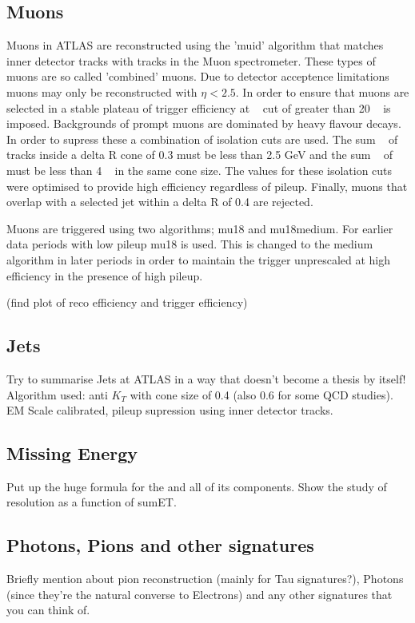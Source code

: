 \subsection{Muons}
\label{sec:muons}
Muons in ATLAS are reconstructed using the 'muid' algorithm that matches inner detector tracks with tracks in the Muon spectrometer. These types of muons are so called 'combined' muons. Due to detector acceptence limitations muons may only be reconstructed with $\eta < 2.5$. In order to ensure that muons are selected in a stable plateau of trigger efficiency at \pt~ cut of greater than 20 \GeV~ is imposed. Backgrounds of prompt muons are dominated by heavy flavour decays. In order to supress these a combination of isolation cuts are used. The sum \pt~ of tracks inside a delta R cone of 0.3 must be less than 2.5 GeV and the sum \et~ of must be less than 4 \GeV~ in the same cone size\cite{ATLAS:Top_dilep_xsec}. The values for these isolation cuts were optimised to provide high efficiency regardless of pileup. Finally, muons that overlap with a selected jet within a delta R of 0.4 are rejected. 

Muons are triggered using two algorithms; mu18 and mu18medium. For earlier data periods with low pileup mu18 is used. This is changed to the medium algorithm in later periods in order to maintain the trigger unprescaled at high efficiency in the presence of high pileup.

(find plot of reco efficiency and trigger efficiency)

\subsection{Jets}
\label{sec:jets}
Try to summarise Jets at ATLAS in a way that doesn't become a thesis by itself! Algorithm used: anti $K_{T}$ with cone size of 0.4 (also 0.6 for some QCD studies). EM Scale calibrated, pileup supression using inner detector tracks. 

\subsection{Missing Energy}
\label{sec:met}
Put up the huge formula for the \etmiss and all of its components. Show the study of \etmiss resolution as a function of sumET. 

\subsection{Photons, Pions and other signatures}
Briefly mention about pion reconstruction (mainly for Tau signatures?), Photons (since they're the natural converse to Electrons) and any other signatures that you can think of.






